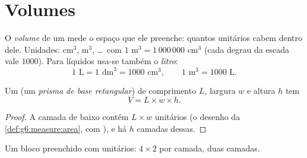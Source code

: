 \section{Volumes}

\begin{definition}[Volume]\label{def:g6:measure:volume}
O \emph{volume} de um  mede o espaço que ele
preenche: quantos  unitários cabem dentro dele. Unidades: cm$^3$,
m$^3$, \dots\ com $1$ m$^3 = 1\,000\,000$ cm$^3$ (cada degrau da escada
vale $1000$). Para líquidos usa-se também o \emph{litro}:
\[
1 \text{ L} = 1 \text{ dm}^3 = 1000 \text{ cm}^3,
\qquad
1 \text{ m}^3 = 1000 \text{ L}.
\]
\end{definition}

\begin{proposition}\label{prop:g6:measure:box}
Um  (um \emph{prisma de base retangular}) de
comprimento $L$, largura $w$ e altura $h$ tem 
\[
V = L \times w \times h .
\]
\end{proposition}

\begin{proof}
A camada de baixo contém $L \times w$  unitários (o desenho da
\cref{def:g6:measure:area}, com ), e há $h$ camadas dessas.
\end{proof}

\begin{omfigure}

{\small Um bloco preenchido com  unitários: $4 \times 2$  por
camada, duas camadas.}
\end{omfigure}

